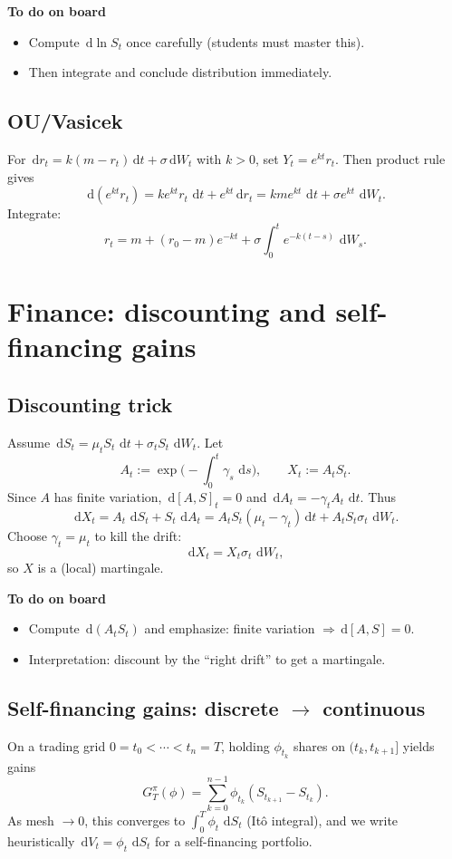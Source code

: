 \documentclass[11pt]{article}
\newcommand{\1}{\mathbf{1}}
\newcommand{\dd}{\,\mathrm{d}}
\numberwithin{equation}{section}
\theoremstyle{plain}
\theoremstyle{definition}
\theoremstyle{remark}
\begin{document}
\textbf{To do on board}
\begin{itemize}[leftmargin=2em]
  \item Compute $\dd\ln S_t$ once carefully (students must master this).
  \item Then integrate and conclude distribution immediately.
\end{itemize}


\subsection{OU/Vasicek}
For $\dd r_t=k(m-r_t)\dd t+\sigma \dd W_t$ with $k>0$, set $Y_t=e^{kt}r_t$.
Then product rule gives
\[
\dd(e^{kt}r_t)=ke^{kt}r_t\,\dd t+e^{kt}\dd r_t
=km e^{kt}\,\dd t+\sigma e^{kt}\,\dd W_t.
\]
Integrate:
\[
r_t=m+(r_0-m)e^{-kt}+\sigma\int_0^t e^{-k(t-s)}\,\dd W_s.
\]

\section{Finance: discounting and self-financing gains}

\subsection{Discounting trick}
Assume $\dd S_t=\mu_t S_t\,\dd t+\sigma_t S_t\,\dd W_t$.
Let
\[
A_t:=\exp\!\Big(-\int_0^t \gamma_s\,\dd s\Big),\qquad X_t:=A_t S_t.
\]
Since $A$ has finite variation, $\dd[A,S]_t=0$ and $\dd A_t=-\gamma_t A_t\,\dd t$.
Thus
\[
\dd X_t = A_t\,\dd S_t + S_t\,\dd A_t
= A_t S_t(\mu_t-\gamma_t)\dd t + A_t S_t\sigma_t\,\dd W_t.
\]
Choose $\gamma_t=\mu_t$ to kill the drift:
\[
\dd X_t = X_t\sigma_t\,\dd W_t,
\]
so $X$ is a (local) martingale.

\textbf{To do on board}
\begin{itemize}[leftmargin=2em]
  \item Compute $\dd(A_tS_t)$ and emphasize: finite variation $\Rightarrow \dd[A,S]=0$.
  \item Interpretation: discount by the “right drift” to get a martingale.
\end{itemize}


\subsection{Self-financing gains: discrete $\to$ continuous}
On a trading grid $0=t_0<\cdots<t_n=T$, holding $\phi_{t_k}$ shares on $(t_k,t_{k+1}]$ yields gains
\[
G_T^\pi(\phi)=\sum_{k=0}^{n-1}\phi_{t_k}(S_{t_{k+1}}-S_{t_k}).
\]
As mesh $\to 0$, this converges to $\int_0^T \phi_t\,\dd S_t$ (It\^o integral),
and we write heuristically $\dd V_t=\phi_t\,\dd S_t$ for a self-financing portfolio.
\end{document}
